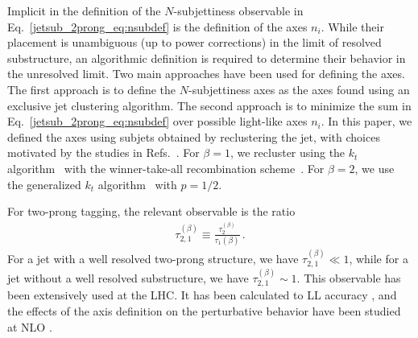 \documentclass[11pt,letterpaper]{article}
\begin{document}
Implicit in the definition of the $N$-subjettiness observable in
Eq.~\ref{jetsub_2prong_eq:nsubdef} is the definition of the axes $n_i$.
%
While their
placement is unambiguous (up to power corrections) in the limit of resolved substructure, an algorithmic definition is required to
determine their behavior in the unresolved limit.
%
Two main approaches
have been used for defining the axes.
%
The first approach is to define
the $N$-subjettiness axes as the axes found using an exclusive jet
clustering algorithm. The second approach is to minimize the sum in
Eq.~\ref{jetsub_2prong_eq:nsubdef} over possible light-like axes $n_i$.
%
In this paper, we defined the axes using subjets obtained by reclustering the jet, with choices motivated by the studies in Refs.~\cite{Stewart:2015waa,Dasgupta:2015lxh}.
%
For $\beta = 1$, we recluster using the $k_t$ algorithm~\cite{Catani:1993hr} with the
  winner-take-all recombination scheme~\cite{Larkoski:2014uqa}.
%
For $\beta = 2$, we use the generalized $k_t$ algorithm~\cite{Cacciari:2011ma} with $p=1/2$.

For two-prong tagging, the relevant observable is the ratio \cite{Thaler:2010tr}
\begin{align}
\tau_{2,1}^{(\beta)}\equiv \frac{\tau_{2}^{(\beta)}}{\tau_{1}{(\beta)}}\,.
\end{align}
For a jet with a well resolved two-prong structure, we have $\tau_{2,1}^{(\beta)}\ll 1$, while for a jet without a well resolved substructure, we have $\tau_{2,1}^{(\beta)}\sim 1$.
%
This observable has been extensively used at the LHC.
%
It has been calculated to LL accuracy \cite{Dasgupta:2015lxh}, and the effects of the axis definition on the perturbative behavior have been studied at NLO \cite{Larkoski:2015uaa}.
\end{document}
